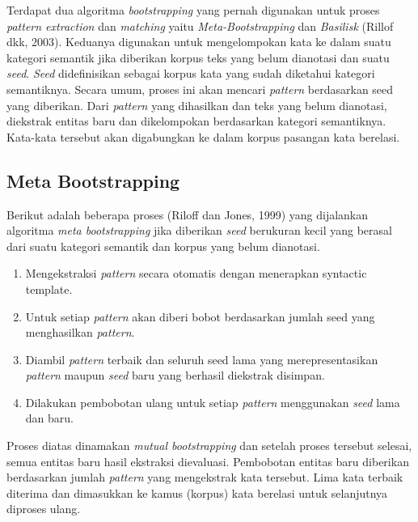Terdapat dua algoritma \textit{bootstrapping} yang pernah digunakan untuk proses \textit{pattern extraction} dan \textit{matching} yaitu \textit{Meta-Bootstrapping} dan \textit{Basilisk} (Rillof dkk, 2003). Keduanya digunakan untuk mengelompokan kata ke dalam suatu kategori semantik jika diberikan korpus teks yang belum dianotasi dan suatu \textit{seed}. \textit{Seed} didefinisikan sebagai korpus kata yang sudah diketahui kategori semantiknya. Secara umum, proses ini akan mencari \textit{pattern} berdasarkan seed yang diberikan. Dari \textit{pattern} yang dihasilkan dan teks yang belum dianotasi, diekstrak entitas baru dan dikelompokan berdasarkan kategori semantiknya. Kata-kata tersebut akan digabungkan ke dalam korpus pasangan kata berelasi.

\subsection{Meta Bootstrapping}
Berikut adalah beberapa proses (Riloff dan Jones, 1999) yang dijalankan algoritma \textit{meta bootstrapping} jika diberikan \textit{seed} berukuran kecil yang berasal dari suatu kategori semantik dan korpus yang belum dianotasi.
\begin{enumerate}
  \item Mengekstraksi \textit{pattern} secara otomatis dengan menerapkan syntactic template.
  \item Untuk setiap \textit{pattern} akan diberi bobot berdasarkan jumlah seed yang menghasilkan \textit{pattern}.
  \item Diambil \textit{pattern} terbaik dan seluruh seed lama yang merepresentasikan \textit{pattern} maupun \textit{seed} baru yang berhasil diekstrak disimpan.
  \item Dilakukan pembobotan ulang untuk setiap \textit{pattern} menggunakan \textit{seed} lama dan baru.
\end{enumerate}
Proses diatas dinamakan \textit{mutual bootstrapping} dan setelah proses tersebut selesai, semua entitas baru hasil ekstraksi dievaluasi. Pembobotan entitas baru diberikan berdasarkan jumlah \textit{pattern} yang mengekstrak kata tersebut. Lima kata terbaik diterima dan dimasukkan ke kamus (korpus) kata berelasi untuk selanjutnya diproses ulang.

